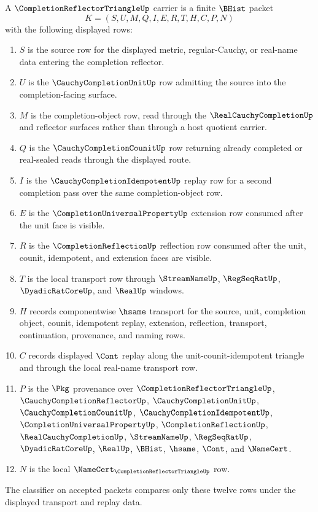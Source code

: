 \begin{definition}
\label{def:completion-reflector-triangle-carrier}
A $\CompletionReflectorTriangleUp$ carrier is a finite $\BHist$ packet
$$
K=(S,U,M,Q,I,E,R,T,H,C,P,N)
$$
with the following displayed rows:
\begin{enumerate}
\item $S$ is the source row for the displayed metric, regular-Cauchy, or real-name data entering the completion reflector.
\item $U$ is the $\CauchyCompletionUnitUp$ row admitting the source into the completion-facing surface.
\item $M$ is the completion-object row, read through the $\RealCauchyCompletionUp$ and reflector surfaces rather than through a host quotient carrier.
\item $Q$ is the $\CauchyCompletionCounitUp$ row returning already completed or real-sealed reads through the displayed route.
\item $I$ is the $\CauchyCompletionIdempotentUp$ replay row for a second completion pass over the same completion-object row.
\item $E$ is the $\CompletionUniversalPropertyUp$ extension row consumed after the unit face is visible.
\item $R$ is the $\CompletionReflectionUp$ reflection row consumed after the unit, counit, idempotent, and extension faces are visible.
\item $T$ is the local transport row through $\StreamNameUp$, $\RegSeqRatUp$, $\DyadicRatCoreUp$, and $\RealUp$ windows.
\item $H$ records componentwise $\hsame$ transport for the source, unit, completion object, counit, idempotent replay, extension, reflection, transport, continuation, provenance, and naming rows.
\item $C$ records displayed $\Cont$ replay along the unit-counit-idempotent triangle and through the local real-name transport row.
\item $P$ is the $\Pkg$ provenance over $\CompletionReflectorTriangleUp$, $\CauchyCompletionReflectorUp$, $\CauchyCompletionUnitUp$, $\CauchyCompletionCounitUp$, $\CauchyCompletionIdempotentUp$, $\CompletionUniversalPropertyUp$, $\CompletionReflectionUp$, $\RealCauchyCompletionUp$, $\StreamNameUp$, $\RegSeqRatUp$, $\DyadicRatCoreUp$, $\RealUp$, $\BHist$, $\hsame$, $\Cont$, and $\NameCert$.
\item $N$ is the local $\NameCert_{\CompletionReflectorTriangleUp}$ row.
\end{enumerate}
The classifier on accepted packets compares only these twelve rows under the displayed transport and replay data.
\end{definition}

